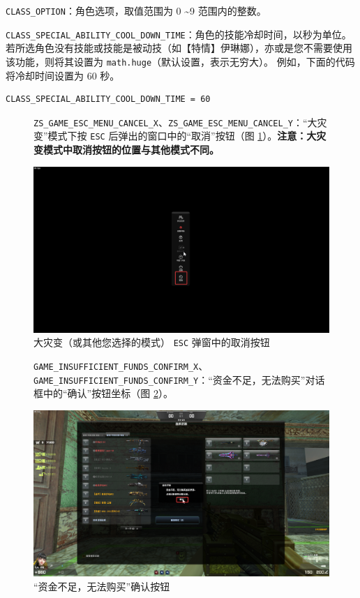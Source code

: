 \lstinline{CLASS_OPTION}：角色选项，取值范围为 0 \textasciitilde 9 范围内的整数。

\lstinline{CLASS_SPECIAL_ABILITY_COOL_DOWN_TIME}：角色的技能冷却时间，以秒为单位。若所选角色没有技能或技能是被动技（如【特情】伊琳娜），亦或是您不需要使用该功能，则将其设置为 \lstinline{math.huge}（默认设置，表示无穷大）。
例如，下面的代码将冷却时间设置为 60 秒。

\begin{verbatim}
CLASS_SPECIAL_ABILITY_COOL_DOWN_TIME = 60
\end{verbatim}

\begin{figure}[H]
    \Centering
    \parbox[l]{\textwidth}{\lstinline{ZS_GAME_ESC_MENU_CANCEL_X}、\lstinline{ZS_GAME_ESC_MENU_CANCEL_Y}：“大灾变”模式下按 \lstinline{ESC} 后弹出的窗口中的“取消”按钮（图 \ref{ch2fig-zs-esc-cancel}）。\textbf{\color{red}注意：大灾变模式中取消按钮的位置与其他模式不同。}}
    \includegraphics[width=\textwidth]{docs/assets/zs_esc_cancel.png}
    \caption{大灾变（或其他您选择的模式） \lstinline{ESC} 弹窗中的取消按钮}
    \label{ch2fig-zs-esc-cancel}
\end{figure}
\clearpage

\begin{figure}[H]
    \Centering
    \parbox[l]{\textwidth}{\lstinline{GAME_INSUFFICIENT_FUNDS_CONFIRM_X}、\lstinline{GAME_INSUFFICIENT_FUNDS_CONFIRM_Y}：“资金不足，无法购买”对话框中的“确认”按钮坐标（图 \ref{ch2fig-game-insuff-funds-confirm}）。}
    \includegraphics[width=\textwidth]{docs/assets/game_insuff_funds_confirm.png}
    \caption{“资金不足，无法购买”确认按钮}
    \label{ch2fig-game-insuff-funds-confirm}
\end{figure}
\clearpage

